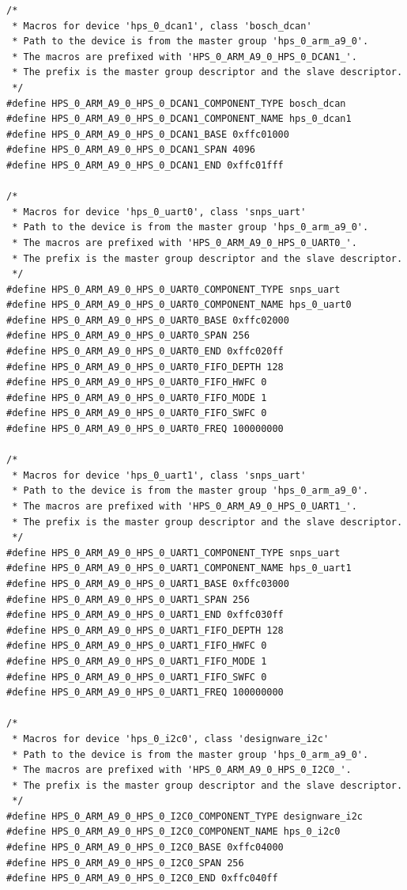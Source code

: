 \documentclass[conference]{IEEEtran}
\begin{document}
\begin{lstlisting}
/*
 * Macros for device 'hps_0_dcan1', class 'bosch_dcan'
 * Path to the device is from the master group 'hps_0_arm_a9_0'.
 * The macros are prefixed with 'HPS_0_ARM_A9_0_HPS_0_DCAN1_'.
 * The prefix is the master group descriptor and the slave descriptor.
 */
#define HPS_0_ARM_A9_0_HPS_0_DCAN1_COMPONENT_TYPE bosch_dcan
#define HPS_0_ARM_A9_0_HPS_0_DCAN1_COMPONENT_NAME hps_0_dcan1
#define HPS_0_ARM_A9_0_HPS_0_DCAN1_BASE 0xffc01000
#define HPS_0_ARM_A9_0_HPS_0_DCAN1_SPAN 4096
#define HPS_0_ARM_A9_0_HPS_0_DCAN1_END 0xffc01fff

/*
 * Macros for device 'hps_0_uart0', class 'snps_uart'
 * Path to the device is from the master group 'hps_0_arm_a9_0'.
 * The macros are prefixed with 'HPS_0_ARM_A9_0_HPS_0_UART0_'.
 * The prefix is the master group descriptor and the slave descriptor.
 */
#define HPS_0_ARM_A9_0_HPS_0_UART0_COMPONENT_TYPE snps_uart
#define HPS_0_ARM_A9_0_HPS_0_UART0_COMPONENT_NAME hps_0_uart0
#define HPS_0_ARM_A9_0_HPS_0_UART0_BASE 0xffc02000
#define HPS_0_ARM_A9_0_HPS_0_UART0_SPAN 256
#define HPS_0_ARM_A9_0_HPS_0_UART0_END 0xffc020ff
#define HPS_0_ARM_A9_0_HPS_0_UART0_FIFO_DEPTH 128
#define HPS_0_ARM_A9_0_HPS_0_UART0_FIFO_HWFC 0
#define HPS_0_ARM_A9_0_HPS_0_UART0_FIFO_MODE 1
#define HPS_0_ARM_A9_0_HPS_0_UART0_FIFO_SWFC 0
#define HPS_0_ARM_A9_0_HPS_0_UART0_FREQ 100000000

/*
 * Macros for device 'hps_0_uart1', class 'snps_uart'
 * Path to the device is from the master group 'hps_0_arm_a9_0'.
 * The macros are prefixed with 'HPS_0_ARM_A9_0_HPS_0_UART1_'.
 * The prefix is the master group descriptor and the slave descriptor.
 */
#define HPS_0_ARM_A9_0_HPS_0_UART1_COMPONENT_TYPE snps_uart
#define HPS_0_ARM_A9_0_HPS_0_UART1_COMPONENT_NAME hps_0_uart1
#define HPS_0_ARM_A9_0_HPS_0_UART1_BASE 0xffc03000
#define HPS_0_ARM_A9_0_HPS_0_UART1_SPAN 256
#define HPS_0_ARM_A9_0_HPS_0_UART1_END 0xffc030ff
#define HPS_0_ARM_A9_0_HPS_0_UART1_FIFO_DEPTH 128
#define HPS_0_ARM_A9_0_HPS_0_UART1_FIFO_HWFC 0
#define HPS_0_ARM_A9_0_HPS_0_UART1_FIFO_MODE 1
#define HPS_0_ARM_A9_0_HPS_0_UART1_FIFO_SWFC 0
#define HPS_0_ARM_A9_0_HPS_0_UART1_FREQ 100000000

/*
 * Macros for device 'hps_0_i2c0', class 'designware_i2c'
 * Path to the device is from the master group 'hps_0_arm_a9_0'.
 * The macros are prefixed with 'HPS_0_ARM_A9_0_HPS_0_I2C0_'.
 * The prefix is the master group descriptor and the slave descriptor.
 */
#define HPS_0_ARM_A9_0_HPS_0_I2C0_COMPONENT_TYPE designware_i2c
#define HPS_0_ARM_A9_0_HPS_0_I2C0_COMPONENT_NAME hps_0_i2c0
#define HPS_0_ARM_A9_0_HPS_0_I2C0_BASE 0xffc04000
#define HPS_0_ARM_A9_0_HPS_0_I2C0_SPAN 256
#define HPS_0_ARM_A9_0_HPS_0_I2C0_END 0xffc040ff


\end{lstlisting}
\end{document}
